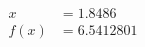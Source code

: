 \documentclass[preview]{standalone}
\begin{document}
\begin{align*}
x &= 1.8486\\f(x) &= 6.5412801
\end{align*}
\end{document}
